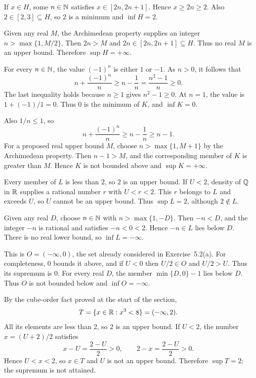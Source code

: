 If $x\in H$, some $n\in\mathbb{N}$ satisfies $x\in[2n,2n+1]$.
Hence $x\ge2n\ge2$. Also $2\in[2,3]\subseteq H$, so $2$ is a
minimum and $\inf H=2$.

Given any real $M$, the Archimedean property supplies an integer
$n>\max\{1,M/2\}$. Then $2n>M$ and
$2n\in[2n,2n+1]\subseteq H$. Thus no real $M$ is an upper bound.
Therefore $\sup H=+\infty$.

For every $n\in\mathbb{N}$, the value $(-1)^n$ is either $1$ or $-1$.
As $n>0$, it follows that
\[
 n+\frac{(-1)^n}{n}
 \ge n-\frac1n
 =\frac{n^2-1}{n}\ge0.
\]
The last inequality holds because $n\ge1$ gives $n^2-1\ge0$.
At $n=1$, the value is $1+(-1)/1=0$. Thus $0$ is the minimum
of $K$, and $\inf K=0$.

Also $1/n\le1$, so
\[
 n+\frac{(-1)^n}{n}\ge n-\frac1n\ge n-1.
\]
For a proposed real upper bound $M$, choose
$n>\max\{1,M+1\}$ by the Archimedean property. Then $n-1>M$,
and the corresponding member of $K$ is greater than $M$. Hence
$K$ is not bounded above and $\sup K=+\infty$.

Every member of $L$ is less than $2$, so $2$ is an upper bound.
If $U<2$, density of $\mathbb{Q}$ in $\mathbb{R}$ supplies a rational number $r$
with $U<r<2$. This $r$ belongs to $L$ and exceeds $U$, so $U$
cannot be an upper bound. Thus $\sup L=2$, although $2\notin L$.

Given any real $D$, choose $n\in\mathbb{N}$ with
$n>\max\{1,-D\}$. Then $-n<D$, and the integer $-n$ is rational
and satisfies $-n<0<2$. Hence $-n\in L$ lies below $D$.
There is no real lower bound, so $\inf L=-\infty$.

This is $O=(-\infty,0)$, the set already considered in
Exercise~5.2(a). For completeness, $0$ bounds it above, and if
$U<0$ then $U/2\in O$ and $U/2>U$. Thus its supremum is $0$.
For every real $D$, the member $\min\{D,0\}-1$ lies below $D$.
Thus $O$ is not bounded below and $\inf O=-\infty$.

By the cube-order fact proved at the start of the section,
\[
 T=\{x\in\mathbb{R}:x^3<8\}=(-\infty,2).
\]
All its elements are less than $2$, so $2$ is an upper bound.
If $U<2$, the number $x=(U+2)/2$ satisfies
\[
 x-U=\frac{2-U}{2}>0,
 \qquad 2-x=\frac{2-U}{2}>0.
\]
Hence $U<x<2$, so $x\in T$ and $U$ is not an upper bound.
Therefore $\sup T=2$; the supremum is not attained.

